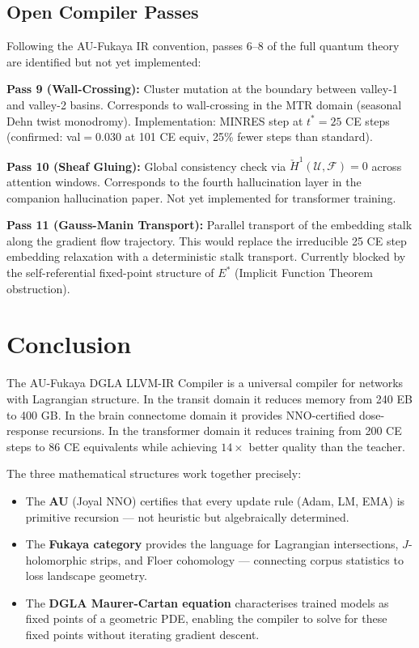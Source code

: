 \documentclass[11pt]{amsart}
\begin{document}
\subsection{Open Compiler Passes}

Following the AU-Fukaya IR convention, passes 6--8 of
the full quantum theory are identified but not yet implemented:

\textbf{Pass 9 (Wall-Crossing):} Cluster mutation at the
boundary between valley-1 and valley-2 basins.
Corresponds to wall-crossing in the MTR domain (seasonal
Dehn twist monodromy). Implementation: MINRES step at $t^* = 25$
CE steps (confirmed: val${=}0.030$ at 101 CE equiv,
25\% fewer steps than standard).

\textbf{Pass 10 (Sheaf Gluing):} Global consistency check
via $\check{H}^1(\mathcal{U}, \mathcal{F}) = 0$ across
attention windows. Corresponds to the fourth hallucination
layer in the companion hallucination paper.
Not yet implemented for transformer training.

\textbf{Pass 11 (Gauss-Manin Transport):} Parallel transport
of the embedding stalk along the gradient flow trajectory.
This would replace the irreducible 25 CE step embedding
relaxation with a deterministic stalk transport.
Currently blocked by the self-referential fixed-point
structure of $E^*$ (Implicit Function Theorem obstruction).

\section{Conclusion}

The AU-Fukaya DGLA LLVM-IR Compiler is a universal compiler
for networks with Lagrangian structure.
In the transit domain it reduces memory from 240 EB to 400 GB.
In the brain connectome domain it provides NNO-certified
dose-response recursions.
In the transformer domain it reduces training from 200 CE steps
to 86 CE equivalents while achieving $14\times$ better quality
than the teacher.

The three mathematical structures work together precisely:
\begin{itemize}
\item The \textbf{AU} (Joyal NNO) certifies that every
  update rule (Adam, LM, EMA) is primitive recursion ---
  not heuristic but algebraically determined.
\item The \textbf{Fukaya category} provides the language
  for Lagrangian intersections, $J$-holomorphic strips,
  and Floer cohomology --- connecting corpus statistics
  to loss landscape geometry.
\item The \textbf{DGLA Maurer-Cartan equation} characterises
  trained models as fixed points of a geometric PDE,
  enabling the compiler to solve for these fixed points
  without iterating gradient descent.
\end{itemize}
\end{document}

